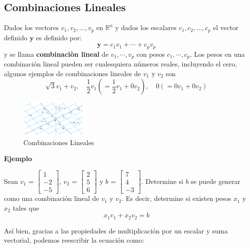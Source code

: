 \documentclass{article}
\begin{document}
\subsection*{Combinaciones Lineales}

Dados los vectores $v_1,v_2,\dots, v_p$ en $\mathbb{R}^n$ y dados los escalares $c_1,c_2,\dots, c_p$ el vector definido $\mathbf{y}$ es definido por:$$\mathbf{y} = c_1v_1 + \dotsb +  c_pv_p$$ y se llama \textbf{combinaciòn lineal} de $v_1, \dotsb, v_p$ con pesos $c_1, \dotsb, c_p$. Los pesos en una combinación lineal pueden ser cualesquiera números reales, incluyendo el cero, algunos ejemplos de combinaciones lineales de $v_1$ y $v_2$ son $$\sqrt{3}v_1 + v_2, \quad \frac{1}{2}v_1(= \frac{1}{2}v_1 + 0v_2), \quad 0 (= 0v_1 + 0v_2)$$

\begin{figure}[ht]
    \centerline{\includegraphics[width=0.3\textwidth]{image10.png}}
    \caption{Combinaciones Lineales}
    \label{}
\end{figure}

\begin{large}
    \textbf{Ejemplo}
\end{large}

Sean \textbf{$v_1$} = $\begin{bmatrix} 1\\-2\\-5 \end{bmatrix}$, \textbf{$v_2$} = $\begin{bmatrix} 2\\5\\6 \end{bmatrix}$  y \textbf{$b$} = $\begin{bmatrix} 7\\4\\-3 \end{bmatrix}$. Determine si \textbf{$b$} se puede generar como una combinación lineal de \textbf{$v_1$} y \textbf{$v_2$}. Es decir, determine si existen pesos $x_1$ y $x_2$ tales que $$x_1\textbf{$v_1$} + x_2\textbf{$v_2$} = \textbf{$b$}$$

Así bien, gracias a las propiedades de multiplicación por un escalar y suma vectorial, podemos reescribir la ecuación como:
\end{document}

